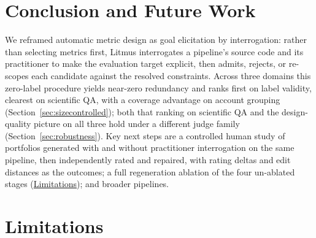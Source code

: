 \documentclass[11pt]{article}
\begin{document}
\section{Conclusion and Future Work}
\label{sec:conclusion}

We reframed automatic metric design as goal elicitation by interrogation: rather than selecting metrics first, Litmus interrogates a pipeline's source code and its practitioner to make the evaluation target explicit, then admits, rejects, or re-scopes each candidate against the resolved constraints. Across three domains this zero-label procedure yields near-zero redundancy and ranks first on label validity, clearest on scientific QA, with a coverage advantage on account grouping (Section~\ref{sec:sizecontrolled}); both that ranking on scientific QA and the design-quality picture on all three hold under a different judge family (Section~\ref{sec:robustness}). Key next steps are a controlled human study of portfolios generated with and without practitioner interrogation on the same pipeline, then independently rated and repaired, with rating deltas and edit distances as the outcomes; a full regeneration ablation of the four un-ablated stages (\hyperref[sec:limitations]{Limitations}); and broader pipelines.

\section*{Limitations}
\label{sec:limitations}
\end{document}
